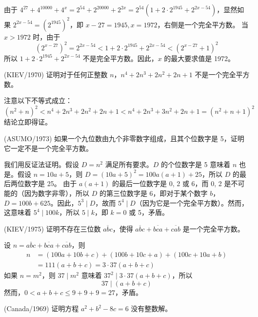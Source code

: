 \begin{questions}
\begin{solution}
由于 $4^{27} + 4^{10000} + 4^x = 2^{54} + 2^{20000} + 2^{2x} = 2^{54}(1 + 2 \cdot 2^{1945} + 2^{2x-54})$，显然如果 $2^{2x-54} = (2^{1945})^2$，即 $x - 27 = 1945, x = 1972$，右侧是一个完全平方数。
当 $x > 1972$ 时，由于
\[
(2^{x-27})^2 = 2^{2x-54} < 1 + 2 \cdot 2^{1945} + 2^{2x-54} < (2^{x-27} + 1)^2
\]
所以 $1 + 2 \cdot 2^{1945} + 2^{2x-54}$ 不是完全平方数。因此，$x$ 的最大要求值是 1972。
\end{solution}

\question (KIEV/1970) 证明对于任何正整数 $n$，$n^4 + 2n^3 + 2n^2 + 2n + 1$ 不是一个完全平方数。

\begin{solution}
注意以下不等式成立：
\[
(n^2 + n)^2 < n^4 + 2n^3 + 2n^2 + 2n + 1 < n^4 + 2n^3 + 3n^2 + 2n + 1 = (n^2 + n + 1)^2
\]
结论立即得证。
\end{solution}

\question (ASUMO/1973) 如果一个九位数由九个非零数字组成，且其个位数字是 5，证明它一定不是一个完全平方数。

\begin{solution}
我们用反证法证明。假设 $D = n^2$ 满足所有要求。$D$ 的个位数字是 5 意味着 $n$ 也是。假设 $n = 10a + 5$，则 $D = (10a + 5)^2 = 100a(a + 1) + 25$，所以 $D$ 的最后两位数字是 25。
由于 $a(a + 1)$ 的最后一位数字是 0, 2 或 6，而 0, 2 是不可能的（因为数字非零），所以 $D$ 的第三位数字是 6，即对于某个数字 $b$，$D = 100b + 625$。因此，$5^3 \mid D$，故而 $5^4 \mid D$（因为它是一个完全平方数）。然而，这意味着 $5^4 \mid 100k$，所以 $5 \mid k$，即 $k = 0$ 或 5，矛盾。
\end{solution}

\question (KIEV/1975) 证明不存在三位数 $\overline{abc}$，使得 $\overline{abc} + \overline{bca} + \overline{cab}$ 是一个完全平方数。

\begin{solution}
设 $n = \overline{abc} + \overline{bca} + \overline{cab}$，则
\begin{align*}
n &= (100a + 10b + c) + (100b + 10c + a) + (100c + 10a + b)\\
&= 111(a + b + c) = 3 \cdot 37(a + b + c)
\end{align*}
如果 $n = m^2$，则 $37 \mid m^2$ 意味着 $37^2 \mid 3 \cdot 37(a + b + c)$，所以
\[
37 \mid (a + b + c)
\]
然而，$0 < a + b + c \le 9 + 9 + 9 = 27$，矛盾。
\end{solution}

\question (Canada/1969) 证明方程 $a^2 + b^2 - 8c = 6$ 没有整数解。


\end{questions}
